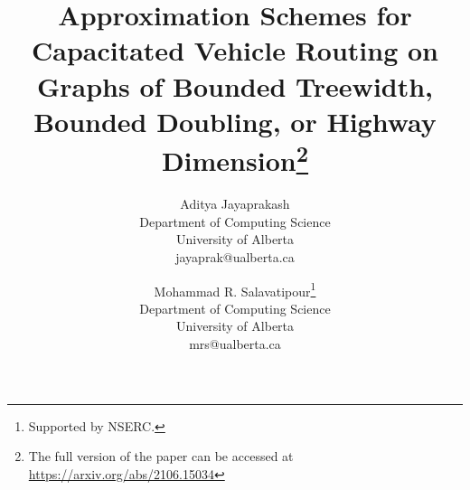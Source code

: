 \documentclass[twoside,leqno]{article}
\date{}
\begin{document}
\newcommand\relatedversion{}
\renewcommand\relatedversion{\thanks{The full version of the paper can be accessed at \protect\url{https://arxiv.org/abs/2106.15034}}}


\title{\Large Approximation Schemes for Capacitated Vehicle Routing on Graphs of Bounded Treewidth, Bounded Doubling, or Highway Dimension\relatedversion}
\author{Aditya Jayaprakash\\
Department of Computing Science\\
University of Alberta\\
jayaprak@ualberta.ca \and
Mohammad R. Salavatipour\thanks{Supported by NSERC.}\\
Department of Computing Science\\
University of Alberta\\
mrs@ualberta.ca}

\date{}

\maketitle
{}

\newcommand{\tvec}{\vec{t}}
\newcommand{\yvec}{\vec{y}}
\newcommand{\nvec}{\vec{n}}
\newcommand{\dvec}{\vec{d}}
\newcommand{\hvec}{\vec{h}}
\newcommand{\lvec}{\vec{l}}
\newcommand{\zvec}{\vec{z}}
\newcommand{\ovec}{\vec{o}}
\newcommand{\pvec}{\vec{p}}
\newcommand{\onevec}{\mathbbm{1}}
\newcommand{\bbold}{\textbf{B}}
\newcommand{\cbold}{\textbf{C}}
\newcommand{\abold}{\textbf{A}}
\newcommand{\ebold}{\textbf{E}}
\newcommand{\hbold}{\textbf{H}}
\newcommand{\ibold}{\textbf{I}}

\newcommand{\hevmixed}{\text{heavy part of mixed-segment}}
\newcommand{\aditya}[1]{{\color{violet}Aditya: #1}}
\newcommand{\chop}{\text{chop}}
\newcommand{\tope}{\text{top}}
\newcommand{\norm}[1]{\left\lVert#1\right\rVert}

\newcommand{\boundellipse}[3]%
{(#1) ellipse (#2 and #3)
}
\end{document}
